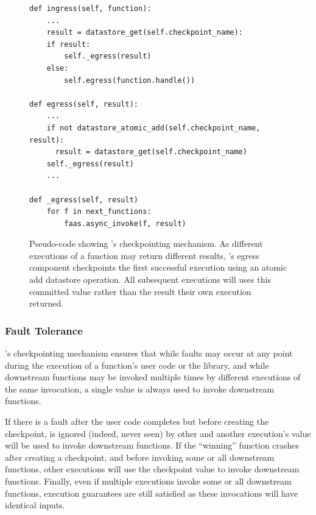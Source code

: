 \begin{figure}
\begin{verbatim}
def ingress(self, function):
    ...
    result = datastore_get(self.checkpoint_name):
    if result:
        self._egress(result)
    else:
        self.egress(function.handle())

def egress(self, result):
    ...
    if not datastore_atomic_add(self.checkpoint_name, result):
      result = datastore_get(self.checkpoint_name)
    self._egress(result)
    ...

def _egress(self, result)
    for f in next_functions:
        faas.async_invoke(f, result)
\end{verbatim}
\caption{Pseudo-code showing \name{}'s checkpointing mechanism. As different
executions of a function may return different results, \name{}'s egress
component checkpoints the first successful execution using an atomic add
datastore operation. All subsequent executions will uses this committed value
rather than the result their own execution returned.}
\label{fig:design:checkpoint}
\end{figure}

\subsubsection{Fault Tolerance}

\name{}'s checkpointing mechanism ensures that while faults may occur at any
point during the execution of a function's user code or the \name{} library, and
while downstream functions may be invoked multiple times by different executions
of the same invocation, a single value is always used to invoke downstream
functions.

If there is a fault after the user code completes but before creating the
checkpoint,  is ignored (indeed,
never seen) by other  and another execution's value will be used to
invoke downstream functions.  If the ``winning'' function crashes after
creating a checkpoint, and before invoking some or all downstream functions,
other executions will use the checkpoint value to invoke downstream functions.
Finally, even if multiple executions invoke some or all downstream functions,
execution guarantees are still satisfied as these invocations will have
identical inputs.



